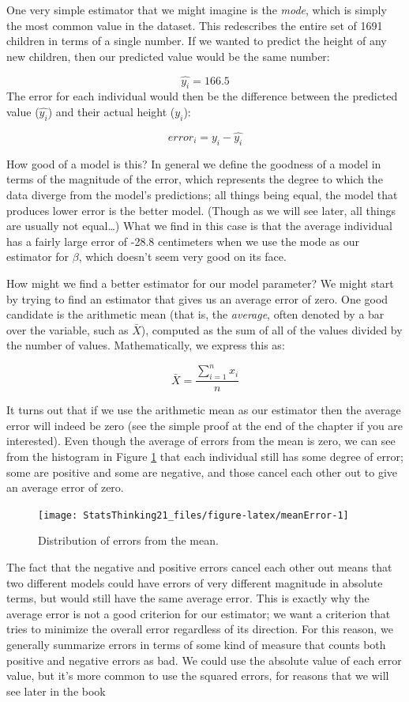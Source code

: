 \documentclass[12pt,]{book}
\theoremstyle{definition}
\theoremstyle{definition}
\theoremstyle{definition}
\theoremstyle{remark}
\begin{document}
One very simple estimator that we might imagine is the \emph{mode}, which is simply the most common value in the dataset. This redescribes the entire set of 1691 children in terms of a single number. If we wanted to predict the height of any new children, then our predicted value would be the same number:

\[
\hat{y_i} = 166.5
\]
The error for each individual would then be the difference between the predicted value (\(\hat{y_i}\)) and their actual height (\(y_i\)):

\[
error_i = y_i - \hat{y_i}
\]

How good of a model is this? In general we define the goodness of a model in terms of the magnitude of the error, which represents the degree to which the data diverge from the model's predictions; all things being equal, the model that produces lower error is the better model. (Though as we will see later, all things are usually not equal\ldots{})
What we find in this case is that the average individual has a fairly large error of -28.8 centimeters when we use the mode as our estimator for \(\beta\), which doesn't seem very good on its face.

How might we find a better estimator for our model parameter? We might start by trying to find an estimator that gives us an average error of zero. One good candidate is the arithmetic mean (that is, the \emph{average}, often denoted by a bar over the variable, such as \(\bar{X}\)), computed as the sum of all of the values divided by the number of values. Mathematically, we express this as:

\[
\bar{X} = \frac{\sum_{i=1}^{n}x_i}{n}
\]

It turns out that if we use the arithmetic mean as our estimator then the average error will indeed be zero (see the simple proof at the end of the chapter if you are interested). Even though the average of errors from the mean is zero, we can see from the histogram in Figure \ref{fig:meanError} that each individual still has some degree of error; some are positive and some are negative, and those cancel each other out to give an average error of zero.

\begin{figure}
\texttt{[image: StatsThinking21\_files/figure-latex/meanError-1]} \caption{Distribution of errors from the mean.}\label{fig:meanError}
\end{figure}

The fact that the negative and positive errors cancel each other out means that two different models could have errors of very different magnitude in absolute terms, but would still have the same average error. This is exactly why the average error is not a good criterion for our estimator; we want a criterion that tries to minimize the overall error regardless of its direction. For this reason, we generally summarize errors in terms of some kind of measure that counts both positive and negative errors as bad. We could use the absolute value of each error value, but it's more common to use the squared errors, for reasons that we will see later in the book
\end{document}
